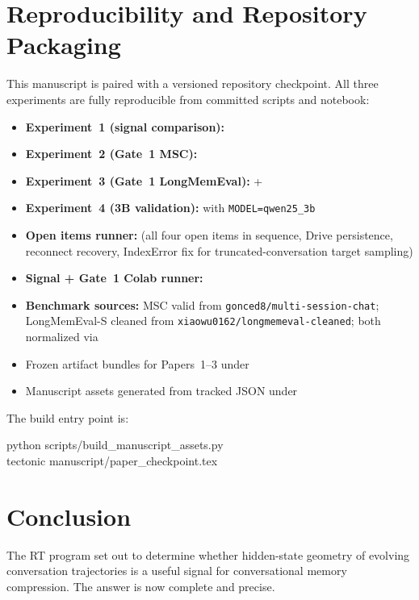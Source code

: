 \documentclass[conference]{IEEEtran}
\begin{document}
\section{Reproducibility and Repository Packaging}
This manuscript is paired with a versioned repository checkpoint. All three experiments are fully reproducible from committed scripts and notebook:

\begin{itemize}[leftmargin=1.4em]
    \item \textbf{Experiment~1 (signal comparison):} 
    \item \textbf{Experiment~2 (Gate~1 MSC):} 
    \item \textbf{Experiment~3 (Gate~1 LongMemEval):}  + 
    \item \textbf{Experiment~4 (3B validation):}  with \texttt{MODEL=qwen25\_3b}
    \item \textbf{Open items runner:}  (all four open items in sequence, Drive persistence, reconnect recovery, IndexError fix for truncated-conversation target sampling)
    \item \textbf{Signal + Gate~1 Colab runner:} 
    \item \textbf{Benchmark sources:} MSC valid from \texttt{gonced8/multi-session-chat}; LongMemEval-S cleaned from \texttt{xiaowu0162/longmemeval-cleaned}; both normalized via 
    \item Frozen artifact bundles for Papers~1--3 under 
    \item Manuscript assets generated from tracked JSON under 
\end{itemize}

The build entry point is:
\begin{center}
\ttfamily
python scripts/build\_manuscript\_assets.py\\
tectonic manuscript/paper\_checkpoint.tex
\end{center}

\section{Conclusion}
The RT program set out to determine whether hidden-state geometry of evolving conversation trajectories is a useful signal for conversational memory compression. The answer is now complete and precise.
\end{document}
